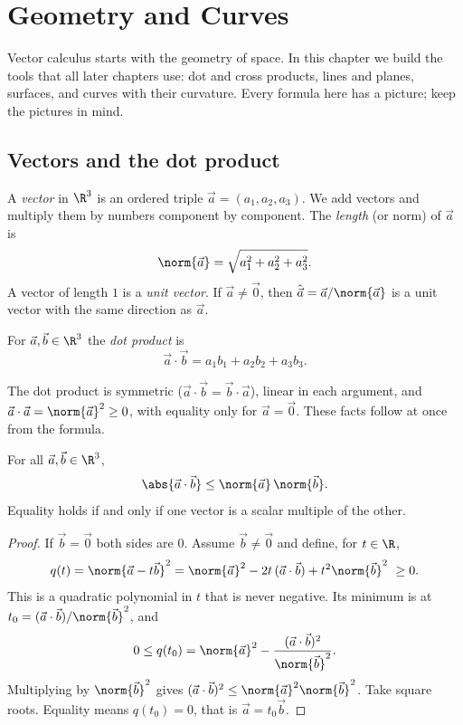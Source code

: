 \chapter{Geometry and Curves}
\label{ch:geometry}

Vector calculus starts with the geometry of space. In this chapter we build the tools that all later chapters use: dot and cross products, lines and planes, surfaces, and curves with their curvature. Every formula here has a picture; keep the pictures in mind.

\section{Vectors and the dot product}

A \emph{vector} in $\R^3$ is an ordered triple $\vec a=(a_1,a_2,a_3)$. We add vectors and multiply them by numbers component by component. The \emph{length} (or norm) of $\vec a$ is
\[
\norm{\vec a}=\sqrt{a_1^2+a_2^2+a_3^2}.
\]
A vector of length $1$ is a \emph{unit vector}. If $\vec a\neq\vec 0$, then $\hat{\vec a}=\vec a/\norm{\vec a}$ is a unit vector with the same direction as $\vec a$.

\begin{definition}
For $\vec a,\vec b\in\R^3$ the \emph{dot product} is
\[
\vec a\cdot\vec b=a_1b_1+a_2b_2+a_3b_3 .
\]
\end{definition}

The dot product is symmetric ($\vec a\cdot\vec b=\vec b\cdot\vec a$), linear in each argument, and $\vec a\cdot\vec a=\norm{\vec a}^2\ge 0$, with equality only for $\vec a=\vec 0$. These facts follow at once from the formula.

\begin{theorem}\label{thm:cs}
For all $\vec a,\vec b\in\R^3$,
\[
\abs{\vec a\cdot\vec b}\le\norm{\vec a}\,\norm{\vec b}.
\]
Equality holds if and only if one vector is a scalar multiple of the other.
\end{theorem}

\begin{proof}
If $\vec b=\vec 0$ both sides are $0$. Assume $\vec b\ne\vec 0$ and define, for $t\in\R$,
\[
q(t)=\norm{\vec a-t\vec b}^2=\norm{\vec a}^2-2t\,(\vec a\cdot\vec b)+t^2\norm{\vec b}^2\ \ge 0 .
\]
This is a quadratic polynomial in $t$ that is never negative. Its minimum is at $t_0=(\vec a\cdot\vec b)/\norm{\vec b}^2$, and
\[
0\le q(t_0)=\norm{\vec a}^2-\frac{(\vec a\cdot\vec b)^2}{\norm{\vec b}^2}.
\]
Multiplying by $\norm{\vec b}^2$ gives $(\vec a\cdot\vec b)^2\le\norm{\vec a}^2\norm{\vec b}^2$. Take square roots. Equality means $q(t_0)=0$, that is $\vec a=t_0\vec b$.
\end{proof}

